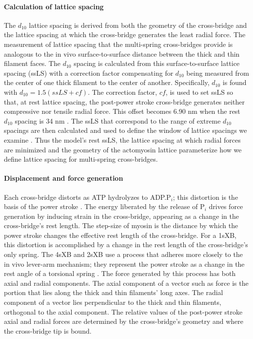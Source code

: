\documentclass[]{article}
\begin{document}
\paragraph{Calculation of lattice spacing} %
The $d_{10}$ lattice spacing is derived from both the geometry of the cross-bridge and the lattice spacing at which the cross-bridge generates the least radial force. 
The measurement of lattice spacing that the multi-spring cross-bridges provide is analogous to the in vivo surface-to-surface distance between the thick and thin filament faces.
The $d_{10}$ spacing is calculated from this surface-to-surface lattice spacing (ssLS) with a correction factor compensating for $d_{10}$ being measured from the center of one thick filament to the center of another. 
Specifically, $d_{10}$ is found with $d_{10} = 1.5 (ssLS + cf)$. 
The correction factor, $cf$, is used to set ssLS so that, at rest lattice spacing, the post-power stroke cross-bridge generates neither compressive nor tensile radial force.  
This offset becomes 6.90 nm when the rest $d_{10}$ spacing is 34 nm \citep{Brenner1991}. 
The ssLS that correspond to the range of extreme $d_{10}$ spacings are then calculated and used to define the window of lattice spacings we examine \citep{Millman1998}. 
Thus the model's rest ssLS, the lattice spacing at which radial forces are minimized and the geometry of the actomyosin lattice parameterize how we define lattice spacing for multi-spring cross-bridges. 

\paragraph{Displacement and force generation} %
Each cross-bridge distorts as ATP hydrolyzes to ADP.P$_i$; this distortion is the basis of the power stroke \citep{Pate1989, Daniel1998, Tanner2007}. 
The energy liberated by the release of P$_i$ drives force generation by inducing strain in the cross-bridge, appearing as a change in the cross-bridge's rest length.  
The step-size of myosin is the distance by which the power stroke changes the effective rest length of the cross-bridge.  
For a 1sXB, this distortion is accomplished by a change in the rest length of the cross-bridge's only spring. 
The 4sXB and 2sXB use a process that adheres more closely to the in vivo lever-arm mechanism; they represent the power stroke as a change in the rest angle of a torsional spring \citep{Reedy2000}.
The force generated by this process has both axial and radial components. 
The axial component of a vector such as force is the portion that lies along the thick and thin filaments' long axes. 
The radial component of a vector lies perpendicular to the thick and thin filaments, orthogonal to the axial component. 
The relative values of the post-power stroke axial and radial forces are determined by the cross-bridge's geometry and where the cross-bridge tip is bound. 
\end{document}
